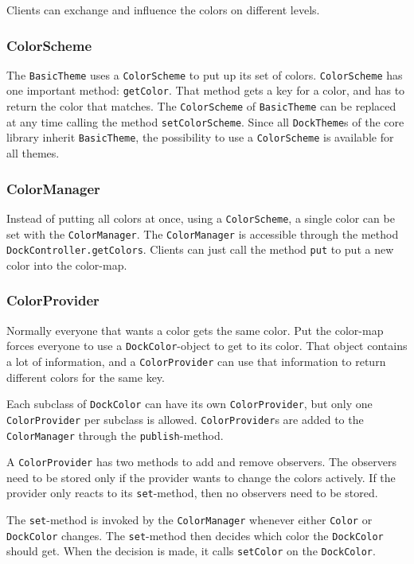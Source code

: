 \documentclass[a4paper,10pt]{article}
\newcommand{\src}[1]{\lstinline[basicstyle=\normalsize\ttfamily,keywordstyle=\normalsize\ttfamily,identifierstyle=\normalsize\ttfamily]|#1|}
\begin{document}
Clients can exchange and influence the colors on different levels.

\subsubsection{ColorScheme}
The \src{BasicTheme} uses a \src{ColorScheme} to put up its set of colors. \src{ColorScheme} has one important method: \src{getColor}. That method gets a key for a color, and has to return the color that matches. The \src{ColorScheme} of \src{BasicTheme} can be replaced at any time calling the method \src{setColorScheme}. Since all \src{DockTheme}s of the core library inherit \src{BasicTheme}, the possibility to use a \src{ColorScheme} is available for all themes.

\subsubsection{ColorManager}
Instead of putting all colors at once, using a \src{ColorScheme}, a single color can be set with the \src{ColorManager}. The \src{ColorManager} is accessible through the method \src{DockController.getColors}. Clients can just call the method \src{put} to put a new color into the color-map.

\subsubsection{ColorProvider}
Normally everyone that wants a color gets the same color. Put the color-map forces everyone to use a \src{DockColor}-object to get to its color. That object contains a lot of information, and a \src{ColorProvider} can use that information to return different colors for the same key.

Each subclass of \src{DockColor} can have its own \src{ColorProvider}, but only one \src{ColorProvider} per subclass is allowed. \src{ColorProvider}s are added to the \src{ColorManager} through the \src{publish}-method.

A \src{ColorProvider} has two methods to add and remove observers. The observers need to be stored only if the provider wants to change the colors actively. If the provider only reacts to its \src{set}-method, then no observers need to be stored.

The \src{set}-method is invoked by the \src{ColorManager} whenever either \src{Color} or \src{DockColor} changes. The \src{set}-method then decides which color the \src{DockColor} should get. When the decision is made, it calls \src{setColor} on the \src{DockColor}.
\end{document}
